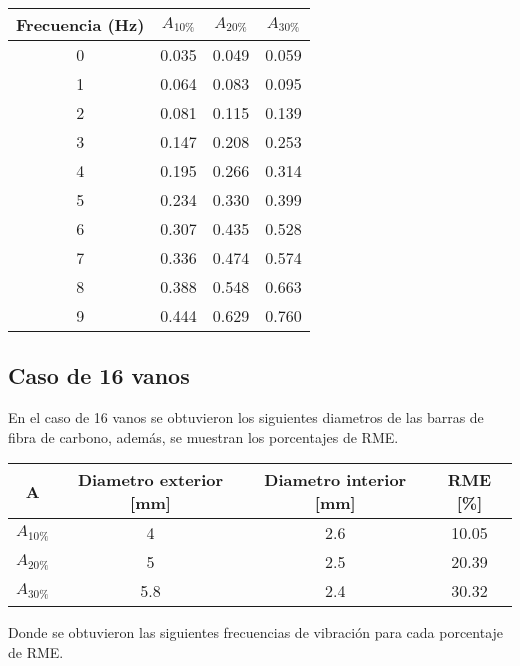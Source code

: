 \begin{table}[H]
    \centering
    \begin{tabular}{cccc}
    \toprule
     Frecuencia (Hz) & $A_{10\%}$ & $A_{20\%}$ & $A_{30\%}$ \\
    \midrule
     0 &       0.035 &       0.049 &       0.059 \\
     1 &       0.064 &       0.083 &       0.095 \\
     2 &       0.081 &       0.115 &       0.139 \\
     3 &       0.147 &       0.208 &       0.253 \\
     4 &       0.195 &       0.266 &       0.314 \\
     5 &       0.234 &       0.330 &       0.399 \\
     6 &       0.307 &       0.435 &       0.528 \\
     7 &       0.336 &       0.474 &       0.574 \\
     8 &       0.388 &       0.548 &       0.663 \\
     9 &       0.444 &       0.629 &       0.760 \\
    \bottomrule
    \end{tabular}
\end{table}


\subsection{Caso de 16 vanos}
En el caso de 16 vanos se obtuvieron los siguientes diametros de las barras de fibra de carbono, además, se muestran los porcentajes de RME.

\begin{table}[H]
    \centering
    \begin{tabular}{cccc}
    \toprule
     A & Diametro exterior [mm] & Diametro interior [mm] & RME [\%] \\
    \midrule
     $A_{10\%}$ &  4 &  2.6 &  10.05 \\
     $A_{20\%}$ &  5 &  2.5 &  20.39 \\
     $A_{30\%}$ &  5.8 &  2.4 &  30.32 \\
    \bottomrule
    \end{tabular}
\end{table}

Donde se obtuvieron las siguientes frecuencias de vibración para cada porcentaje de RME.

